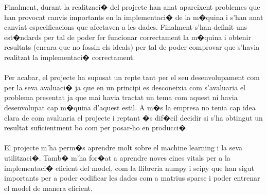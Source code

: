 \documentclass[12pt,a4paper,openright,oneside]{article}
\numberwithin{equation}{section}
\theoremstyle{definition}
\begin{document}
Finalment, durant la realitzaci� del projecte han anat apareixent problemes que han provocat canvis importants en la implementaci� de la m�quina i s'han anat canviat especificacions que afectaven a les dades.  Finalment s'han  definit uns est�ndards  per tal de poder fer funcionar correctament la m�quina i obtenir resultats (encara que no fossin els ideals) per tal de poder comprovar que s'havia realitzat la implementaci� correctament.\\\\
Per acabar, el projecte ha suposat un repte tant per el seu desenvolupament com per la seva avaluaci� ja que en un principi es desconeixia com s'avaluaria el problema presentat ja que mai havia tractat un tema com aquest ni havia desenvolupat cap m�quina d'aquest estil. A m�s la empresa no tenia cap idea clara de com avaluaria el projecte i reptant �s dif�cil decidir si s'ha obtingut un resultat suficientment bo com per posar-ho en producci�.\\\\ El projecte m'ha perm�s aprendre molt sobre el machine learning i la seva utilitzaci�. Tamb� m'ha for�at a aprendre noves eines vitals per a la implementaci� eficient del model, com la llibreria numpy i scipy que han sigut importants per a poder codificar les dades com a matrius sparse i poder entrenar el model de manera eficient.
\newpage
\end{document}
